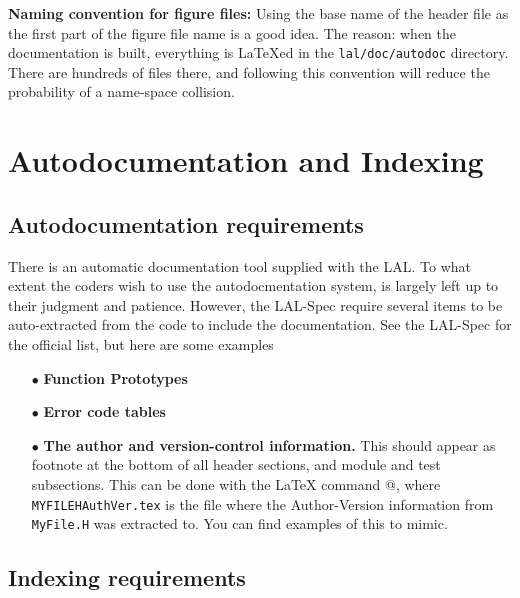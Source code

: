 \documentclass[oneside]{book}
\begin{document}
{\bf Naming convention for figure files:} Using the base name of the
header file as the first part of the figure file name is a good idea.
The reason: when the documentation is built, everything is {\LaTeX}ed
in  the {\tt lal/doc/autodoc} directory. There are hundreds of files there,
and  following this convention will reduce the probability of a
name-space collision.

\section{Autodocumentation and Indexing }

\subsection{Autodocumentation requirements}
There is an automatic documentation tool supplied with the LAL.  To
what extent the coders wish to use the autodocmentation system, is
largely left up to their judgment and patience. However, the
LAL-Spec require several items to be auto-extracted from the code
to include the documentation. See the LAL-Spec for the official
list, but here are some examples

\begin{itemize}
  \item[$\bullet$] {\bf Function Prototypes} 
  \item[$\bullet$] {\bf Error code tables }
  \item[$\bullet$] {\bf The author and version-control information.}  This
                        should appear as footnote at the bottom of all
                        header sections, and module and test subsections.
                        This can be done with the {\LaTeX} command 
                        \verb@\vfill{\footnotesize}@,
                        where {\tt MYFILEHAuthVer.tex} is the file where
                        the Author-Version information from {\tt MyFile.H}
                        was extracted to.  You can find examples of
                        this to mimic.
\end{itemize}

\subsection{Indexing requirements}
\end{document}
